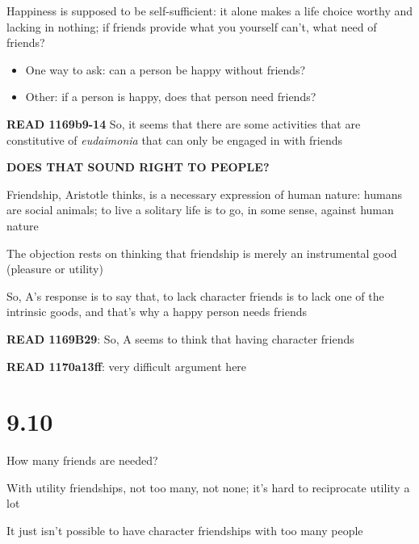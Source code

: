 \documentclass[11pt]{article}
\begin{document}
\noindent Happiness is supposed to be self-sufficient: it alone makes a life choice worthy and lacking in nothing; if friends provide what you yourself can't, what need of friends?

\begin{itemize}\item{One way to ask: can a person be happy without friends?}\item{Other: if a person is happy, does that person need friends?}\end{itemize}

\noindent\textbf{READ 1169b9-14} So, it seems that there are some activities that are constitutive of \emph{eudaimonia} that can only be engaged in with friends
\vspace*{2mm}

\noindent\textbf{DOES THAT SOUND RIGHT TO PEOPLE?}
\vspace*{2mm}

\noindent Friendship, Aristotle thinks, is a necessary expression of human nature: humans are social animals; to live a solitary life is to go, in some sense, against human nature
\vspace*{2mm}

\noindent The objection rests on thinking that friendship is merely an instrumental good (pleasure or utility)
\vspace*{2mm}

\noindent So, A's response is to say that, to lack character friends is to lack one of the intrinsic goods, and that's why a happy person needs friends
\vspace*{2mm}

\noindent \textbf{READ 1169B29}: So, A seems to think that having character friends 
\vspace*{2mm}

\noindent\textbf{READ 1170a13ff}: very difficult argument here

\section{9.10}

\noindent How many friends are needed?
\vspace*{2mm}

\noindent With utility friendships, not too many, not none; it's hard to reciprocate utility a lot
\vspace*{2mm}

\noindent It just isn't possible to have character friendships with too many people
\end{document}
